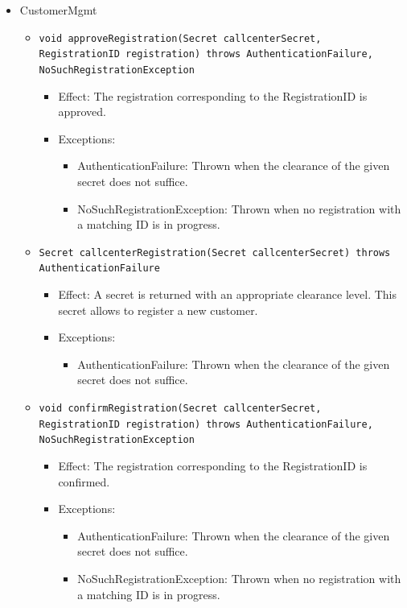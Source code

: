 \documentclass[a4paper,10pt]{article}
\begin{document}
\begin{itemize}
    \item CustomerMgmt
    \begin{itemize}
   		\item \texttt{void approveRegistration(Secret callcenterSecret, RegistrationID registration) throws AuthenticationFailure, NoSuchRegistrationException}
        \begin{itemize}
            \item Effect: The registration corresponding to the RegistrationID is approved.
            \item Exceptions:
            	\begin{itemize}
                	\item AuthenticationFailure: Thrown when the clearance of the given secret does not suffice.
                	\item NoSuchRegistrationException: Thrown when no registration with a matching ID is in progress.
                \end{itemize}
        \end{itemize}
    	\item \texttt{Secret callcenterRegistration(Secret callcenterSecret) throws AuthenticationFailure}
        \begin{itemize}
            \item Effect: A secret is returned with an appropriate clearance level. This secret allows to register a new customer.
            \item Exceptions:
          	\begin{itemize}
            	\item AuthenticationFailure: Thrown when the clearance of the given secret does not suffice.
            \end{itemize}
        \end{itemize}
        
        \item \texttt{void confirmRegistration(Secret callcenterSecret, RegistrationID registration) throws AuthenticationFailure, NoSuchRegistrationException}
        \begin{itemize}
            \item Effect: The registration corresponding to the RegistrationID is confirmed.
            \item Exceptions:
            	\begin{itemize}
	            	\item AuthenticationFailure: Thrown when the clearance of the given secret does not suffice.
                	\item NoSuchRegistrationException: Thrown when no registration with a matching ID is in progress.
                \end{itemize}
        \end{itemize}
        

\end{itemize}
\end{itemize}
\end{document}
